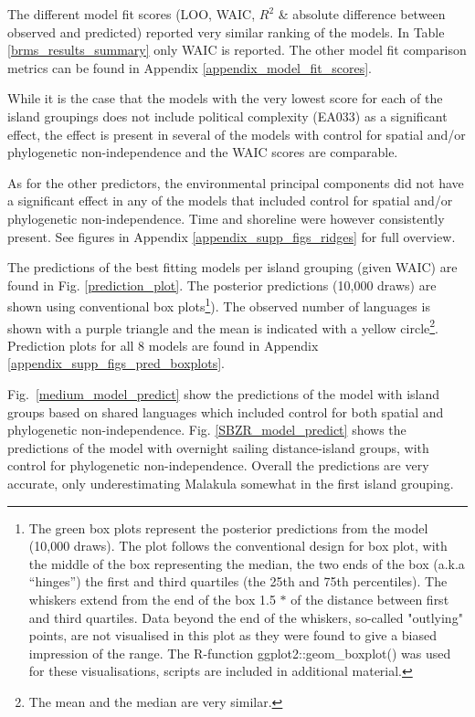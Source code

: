 \documentclass[unnumsec,webpdf,modern,medium]{oup-authoring-template}
\begin{document}
The different model fit scores (LOO, WAIC, $R^2$ \& absolute difference between observed and predicted) reported very similar ranking of the models. In Table \ref{brms_results_summary} only WAIC is reported. The other model fit comparison metrics can be found in Appendix \ref{appendix_model_fit_scores}.  

While it is the case that the models with the very lowest score for each of the island groupings does not include political complexity (EA033) as a significant effect, the effect is present in several of the models with control for spatial and/or phylogenetic non-independence and the WAIC scores are comparable. 

As for the other predictors, the environmental principal components did not have a significant effect in any of the models that included control for spatial and/or phylogenetic non-independence. Time and shoreline were however consistently present. See figures in Appendix \ref{appendix_supp_figs_ridges} for full overview.

The predictions of the best fitting models per island grouping (given WAIC) are found in Fig. \ref{prediction_plot}. The posterior predictions (10,000 draws) are shown using conventional box plots\footnote{The green box plots represent the posterior predictions from the model (10,000 draws). The plot follows the conventional design for box plot, with the middle of the box representing the median, the two ends of the box (a.k.a ``hinges'') the first and third quartiles (the 25th and 75th percentiles). The whiskers extend from the end of the box 1.5 $\ast$  of the distance between first and third quartiles. Data beyond the end of the whiskers, so-called "outlying" points, are not visualised in this plot as they were found to give a biased impression of the range. The R-function  ggplot2::geom\_boxplot() was used for these visualisations, scripts are included in additional material.}). The observed number of languages is shown with a purple triangle and the mean is indicated with a yellow circle\footnote{The mean and the median are very similar.}. Prediction plots for all 8 models are found in Appendix \ref{appendix_supp_figs_pred_boxplots}.

Fig.~\ref{medium_model_predict} show the predictions of the model with island groups based on shared languages which included control for both spatial and phylogenetic non-independence. Fig. \ref{SBZR_model_predict} shows the predictions of the model with overnight sailing distance-island groups, with control for phylogenetic non-independence. Overall the predictions are very accurate, only underestimating Malakula somewhat in the first island grouping.
\end{document}
